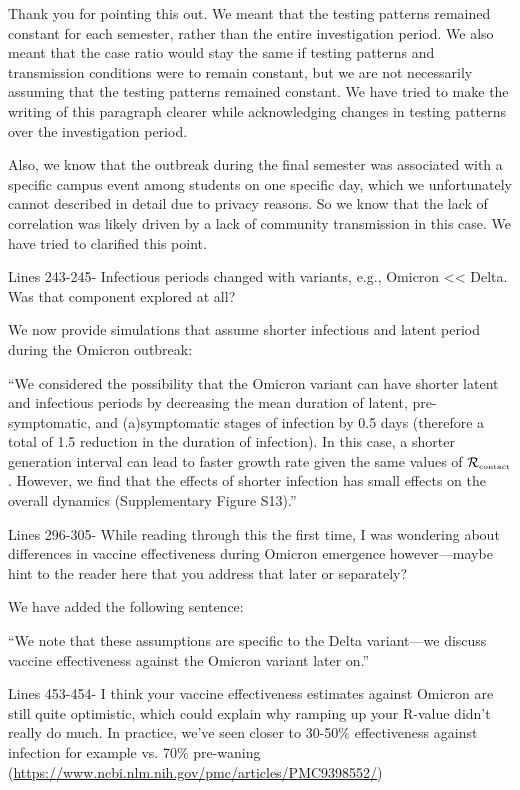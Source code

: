 \documentclass[12pt]{article}
\newcommand{\Rx}[1]{\ensuremath{{\mathcal R}_{#1}}}
\newcommand{\Rc}{\Rx{\textrm{\tiny{contact}}}}
\newcommand{\revtext}{\textsf}
\begin{document}
Thank you for pointing this out. 
We meant that the testing patterns remained constant for each semester, rather than the entire investigation period.
We also meant that the case ratio would stay the same if testing patterns and transmission conditions were to remain constant, but we are not necessarily assuming that the testing patterns remained constant.
We have tried to make the writing of this paragraph clearer while acknowledging changes in testing patterns over the investigation period.

Also, we know that the outbreak during the final semester was associated with a specific campus event among students on one specific day, which we unfortunately cannot described in detail due to privacy reasons. 
So we know that the lack of correlation was likely driven by a lack of community transmission in this case. 
We have tried to clarified this point.

\revtext{Lines 243-245- Infectious periods changed with variants, e.g., Omicron << Delta. Was that component explored at all?} 

We now provide simulations that assume shorter infectious and latent period during the Omicron outbreak:

``We considered the possibility that the Omicron variant can have shorter latent and infectious periods by decreasing the mean duration of latent, pre-symptomatic, and (a)symptomatic stages of infection by 0.5 days (therefore a total of 1.5 reduction in the duration of infection).
In this case, a shorter generation interval can lead to faster growth rate given the same values of $\Rc$ \citep{wallinga2007generation}.
However, we find that the effects of shorter infection has small effects on the overall dynamics (Supplementary Figure S13).''

\revtext{Lines 296-305- While reading through this the first time, I was wondering about differences in vaccine effectiveness during Omicron emergence however—maybe hint to the reader here that you address that later or separately?} 

We have added the following sentence: 

``We note that these assumptions are specific to the Delta variant---we discuss vaccine effectiveness against the Omicron variant later on.''

\revtext{Lines 453-454- I think your vaccine effectiveness estimates against Omicron are still quite optimistic, which could explain why ramping up your R-value didn’t really do much. In practice, we’ve seen closer to 30-50\% effectiveness against infection for example vs. 70\% pre-waning (\url{https://www.ncbi.nlm.nih.gov/pmc/articles/PMC9398552/})}
\end{document}
